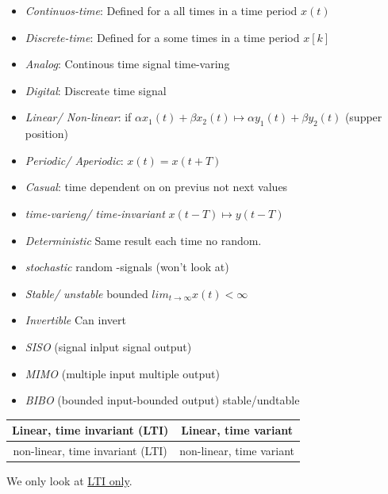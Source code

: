 \begin{itemize}
    \item \textit{Continuos-time}: Defined for a all times in a time period $x(t)$
    \item \textit{Discrete-time}: Defined for a some times in a time period $x[k]$
    \item \textit{Analog}: Continous time signal time-varing 
    \item \textit{Digital}: Discreate time signal
    \item \textit{Linear/ Non-linear}: if $\alpha x_1(t) + \beta x_2(t) \mapsto \alpha y_1(t) + \beta y_2(t)$ (supper position)
    \item \textit{Periodic/ Aperiodic}: $x(t)=x(t+T)$
    \item \textit{Casual}: time dependent on on previus not next values
    \item \textit{time-varieng/ time-invariant} $x(t-T) \mapsto y(t-T)$
    \item \textit{Deterministic} Same result each time no random.
    \item \textit{stochastic} random -signals (won't look at)
    \item \textit{Stable/ unstable}  bounded $lim_{t\to\infty} x(t) < \infty$
    \item \textit{Invertible} Can invert
    \item \textit{SISO} (signal inlput signal output)
    \item \textit{MIMO} (multiple input multiple output)
    \item \textit{BIBO} (bounded input-bounded output) stable/undtable
\end{itemize}

\begin{center}
\begin{tabular}{ | c | c |}
    \hline
    \textbf{Linear, time invariant (LTI)} & Linear, time variant \\
    \hline
    non-linear, time invariant (LTI) & non-linear, time variant \\
    \hline
\end{tabular}
\end{center}

We only look at \underline{LTI only}.


